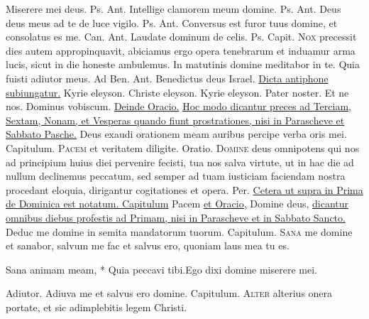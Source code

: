 \begin{multicols*}{2}
 Miserere mei deus. {\color{Red} Ps.}  {\color{Red} Ant.} Intellige clamorem meum domine. {\color{Red} Ps.}  {\color{Red} Ant.} Deus deus meus ad te de luce vigilo. {\color{Red} Ps.}  {\color{Red} Ant.} Conversus est furor tuus domine, et consolatus es me. {\color{Red} Can.}  {\color{Red} Ant.} Laudate dominum de celis. {\color{Red} Ps.}  {\color{Red} Capit.}
\lettrine[lines=2]{\zallmancaps \color{Blue} N}{ox} precessit dies autem appropinquavit, abiciamus ergo opera tenebrarum et induamur arma lucis, sicut in die honeste ambulemus.
\V In matutinis domine meditabor in te. \R Quia fuisti adiutor meus. {\color{Red} Ad Ben. Ant.} Benedictus deus Israel. \ul{Dicta antiphone subiungatur.} Kyrie eleyson. Christe eleyson. Kyrie eleyson. Pater noster. Et ne nos. Dominus vobiscum. \ul{Deinde Oracio.}
\newline \ul{Hoc modo dicantur preces ad Terciam, Sextam, Nonam, et Vesperas quando fiunt prostrationes, nisi in Parascheve et Sabbato Pasche.}
 Deus exaudi orationem meam auribus percipe verba oris mei. {\color{Red} Capitulum.}
\lettrine[lines=2]{\zallmancaps \color{Red} P}{acem} et veritatem diligite. {\color{Red} Oratio.}
\lettrine[lines=2]{\zallmancaps \color{Blue} D}{omine} deus omnipotens qui nos ad principium huius diei pervenire fecisti, tua nos salva virtute, ut in hac die ad nullum declinemus peccatum, sed semper ad tuam iusticiam faciendam nostra procedant eloquia, dirigantur cogitationes et opera. Per. \ul{Cetera ut supra in Prima de Dominica est notatum. Capitulum} Pacem \ul{et Oracio,} Domine deus, \ul{dicantur omnibus diebus profestis ad Primam, nisi in Parascheve et in Sabbato Sancto.}
 Deduc me domine in semita mandatorum tuorum. {\color{Red} Capitulum.}
\lettrine[lines=2]{\zallmancaps \color{Red} S}{ana} me domine et sanabor, salvum me fac et salvus ero, quoniam laus mea tu es.
\begin{responsory-breve}
{Sana animam meam, * Quia peccavi tibi.}{Ego dixi domine miserere mei.}
\end{responsory-breve}
\V Adiutor.
 Adiuva me et salvus ero domine. {\color{Red} Capitulum.}
\lettrine[lines=2]{\zallmancaps \color{Blue} A}{lter} alterius onera portate, et sic adimplebitis legem Christi.

\end{multicols*}
